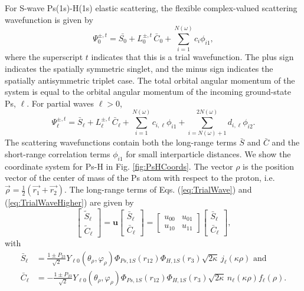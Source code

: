 \documentclass[preprint,showpacs,preprintnumbers,amsmath,amssymb,longbibliography,pra,aps]{revtex4-1}
\begin{document}
For S-wave Ps(1s)-H(1s) elastic scattering, the flexible complex-valued scattering wavefunction is given by
\begin{equation}
\Psi_0^{\pm,t} = \bar{S_0} + L_0^{\pm,t} \, \bar{C}_0 + \sum_{i=1}^{N(\omega)} c_i \phi_{i1},
\label{eq:TrialWave}
\end{equation}
where the superscript $t$ indicates that this is a trial wavefunction. The plus sign indicates the spatially symmetric singlet, and the minus sign indicates the spatially antisymmetric triplet case. The total orbital angular momentum of the system is equal to the orbital angular momentum of the incoming ground-state Ps, $\ell$. For partial waves $\ell > 0$,
\begin{equation}
\Psi_\ell^{\pm,t} = \bar{S}_\ell + L^{\pm,t}_\ell \, \bar{C}_\ell + \sum_{i=1}^{N(\omega)} c_{i,\ell} \phi_{i1} + \!\!\!\sum_{i=N(\omega)+1}^{2N(\omega)} \!\! d_{i,\ell} \phi_{i2}.
\label{eq:TrialWaveHigher}
\end{equation}
The scattering wavefunctions contain both the long-range terms $\bar{S}$ and $\bar{C}$ and the short-range correlation terms $\phi_{i1}$ for small interparticle distances. We show the coordinate system for Ps-H in Fig. \ref{fig:PsHCoords}. The vector $\rho$ is the position vector of the center of mass of the Ps atom with respect to the proton, i.e. $\vec{\rho} = \frac{1}{2}\left(\vec{r_1} + \vec{r_2}\right)$. The long-range terms of Eqs. (\ref{eq:TrialWave}) and (\ref{eq:TrialWaveHigher}) are given by
\begin{equation}
\label{eq:SCPhiDef}
\begin{bmatrix}
\widetilde{S}_\ell \\ \widetilde{C}_\ell
\end{bmatrix} = \textbf{u}  \begin{bmatrix}
\bar{S}_\ell \\ \bar{C}_\ell
\end{bmatrix} = \begin{bmatrix}
u_{00} & u_{01} \\  u_{10} & u_{11}
\end{bmatrix}
\begin{bmatrix}
\bar{S}_\ell \\ \bar{C}_\ell
\end{bmatrix}, 
\end{equation}
with
\begin{subequations}
\label{eq:SCBarPhiDef}
\begin{align}
\bar{S}_\ell &= \frac{1\pm P_{23}}{\sqrt{2}}Y_{\ell 0}(\theta_\rho,\varphi_\rho)\Phi_{Ps,1S}\left(r_{12}\right) \Phi_{H,1S}\left(r_3\right) \sqrt{2\kappa} \,j_\ell\left(\kappa\rho\right) \text{ and} \label{eq:SBar} \\
\bar{C}_\ell &= -\frac{1\pm P_{23}}{\sqrt{2}}Y_{\ell 0}(\theta_\rho,\varphi_\rho)\Phi_{Ps,1S}\left(r_{12}\right) \Phi_{H,1S}\left(r_3\right) \sqrt{2\kappa} \,n_\ell\left(\kappa\rho\right) f_\ell(\rho). \label{eq:CBar}
\end{align}
\end{subequations}
\end{document}
